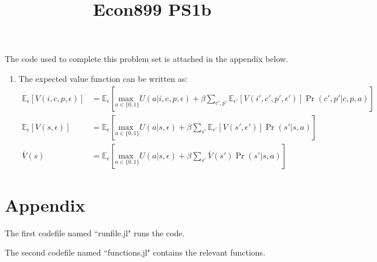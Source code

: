 \documentclass[landscape]{article} %
\title{Econ899 PS1b}
\newcommand{\Ee}[1]{\mathbb{E}_{\epsilon}\left[#1\right]}
\newcommand{\Eep}[1]{\mathbb{E}_{\epsilon'}\left[#1\right]}
\newcommand{\usmax}[1]{\underset{#1}{\text{max }}}
\theoremstyle{definition}
\begin{document}
The code used to complete this problem set is attached in the appendix below.
\begin{enumerate}
	\item The expected value function can be written as:\begin{align*}
            \Ee{V(i, c, p, \epsilon)} &= \Ee{\usmax{a\in\{0, 1\}} U(a|i,c,p,\epsilon) + \beta\sum_{c',p'}\Eep{V(i',c',p',\epsilon')}\Pr(c',p'|c,p,a)} \\
            \Ee{V(s, \epsilon)} &= \Ee{\usmax{a\in\{0, 1\}} U(a|s,\epsilon) + \beta\sum_{s'}\Eep{V(s', \epsilon')}\Pr(s'|s,a)} \\
            \overline{V}(s) &= \Ee{\usmax{a\in\{0, 1\}} U(a|s,\epsilon) + \beta\sum_{s'}\overline{V}(s')\Pr(s'|s,a)} 
        \end{align*}
\end{enumerate}

\newpage
\section*{Appendix}
 	The first codefile named ``runfile.jl" runs the code.
	
 	The second codefile named ``functions.jl" contains the relevant functions.
\end{document}

